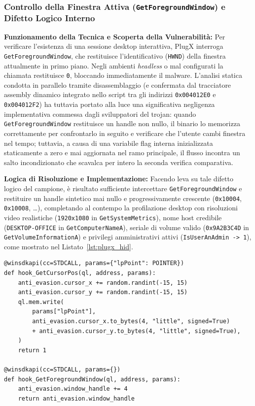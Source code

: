 \documentclass[11pt, a4paper]{article}
\begin{document}
\subsubsection{Controllo della Finestra Attiva (\texttt{GetForegroundWindow}) e Difetto Logico Interno}

\textbf{Funzionamento della Tecnica e Scoperta della Vulnerabilit\`a:} Per verificare l'esistenza di una sessione desktop interattiva, PlugX interroga \texttt{Get\allowbreak{}Foreground\allowbreak{}Window}, che restituisce l'identificativo (\texttt{HWND}) della finestra attualmente in primo piano. Negli ambienti \textit{headless} o mal configurati la chiamata restituisce \texttt{0}, bloccando immediatamente il malware. L'analisi statica condotta in parallelo tramite disassemblaggio (e confermata dal tracciatore assembly dinamico integrato nello script tra gli indirizzi \texttt{0x004012E0} e \texttt{0x004012F2}) ha tuttavia portato alla luce una significativa negligenza implementativa commessa dagli sviluppatori del trojan: quando \texttt{Get\allowbreak{}Foreground\allowbreak{}Window} restituisce un handle non nullo, il binario lo memorizza correttamente per confrontarlo in seguito e verificare che l'utente cambi finestra nel tempo; tuttavia, a causa di una variabile flag interna inizializzata staticamente a zero e mai aggiornata nel ramo principale, il flusso incontra un salto incondizionato che scavalca per intero la seconda verifica comparativa.

\textbf{Logica di Risoluzione e Implementazione:} Facendo leva su tale difetto logico del campione, \`e risultato sufficiente intercettare \texttt{Get\allowbreak{}Foreground\allowbreak{}Window} e restituire un handle sintetico mai nullo e progressivamente crescente (\texttt{0x10004}, \texttt{0x10008}, \dots), completando al contempo la profilazione desktop con risoluzioni video realistiche (\texttt{1920x1080} in \texttt{Get\allowbreak{}System\allowbreak{}Metrics}), nome host credibile (\texttt{DESKTOP-\allowbreak{}OFFICE} in \texttt{Get\allowbreak{}Computer\allowbreak{}NameA}), seriale di volume valido (\texttt{0x9A2B3C4D} in \texttt{Get\allowbreak{}Volume\allowbreak{}InformationA}) e privilegi amministrativi attivi (\texttt{Is\allowbreak{}User\allowbreak{}An\allowbreak{}Admin -> 1}), come mostrato nel Listato~\ref{lst:plugx_hid}.

\begin{lstlisting}[style=pythoncode, caption={Simulazione dell'interazione umana (HID/GUI) su GetCursorPos e GetForegroundWindow.}, label={lst:plugx_hid}]
@winsdkapi(cc=STDCALL, params={"lpPoint": POINTER})
def hook_GetCursorPos(ql, address, params):
    anti_evasion.cursor_x += random.randint(-15, 15)
    anti_evasion.cursor_y += random.randint(-15, 15)
    ql.mem.write(
        params["lpPoint"],
        anti_evasion.cursor_x.to_bytes(4, "little", signed=True)
        + anti_evasion.cursor_y.to_bytes(4, "little", signed=True),
    )
    return 1

@winsdkapi(cc=STDCALL, params={})
def hook_GetForegroundWindow(ql, address, params):
    anti_evasion.window_handle += 4
    return anti_evasion.window_handle
\end{lstlisting}
\end{document}
